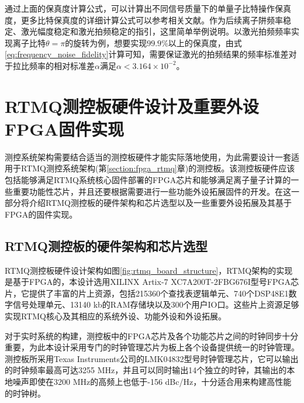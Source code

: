 通过上面的保真度计算公式，可以计算出不同信号质量下的单量子比特操作保真度，更多比特保真度的详细计算公式可以参考相关文献\cite[]{van_Dijk_Kawakami_Schouten_Veldhorst_Vandersypen_Babaie_Charbon_Sebastiano_2019}。作为后续离子阱频率稳定、激光幅度稳定和激光拍频稳定的指引，这里简单举例说明。以激光拍频频率实现离子比特$\theta=\pi$的旋转为例，想要实现$99.9\%$以上的保真度，由式\eqref{eq:frequency_noise_fidelity}计算可知，需要保证激光的拍频结果的频率标准差对于拉比频率的相对标准差$\alpha$满足$\alpha < 3.164\times10^{-2}$。






\section[RTMQ测控板硬件设计及重要外设FPGA固件实现]{RTMQ测控板硬件设计及重要外设FPGA固件实现}

测控系统架构需要结合适当的测控板硬件才能实际落地使用，为此需要设计一套适用于RTMQ测控系统架构(第\ref{section:fpga_rtmq}章)的测控板。该测控板硬件应该包括能够满足RTMQ系统核心固件部署的FPGA芯片和能够满足离子量子计算的一些重要功能性芯片，并且还要根据需要进行一些功能外设拓展固件的开发。在这一部分将介绍RTMQ测控板的硬件架构和芯片选型以及一些重要外设拓展及其基于FPGA的固件实现。

\subsection[RTMQ测控板的硬件架构和芯片选型]{RTMQ测控板的硬件架构和芯片选型}

RTMQ测控板硬件设计架构如图\ref{fig:rtmq_board_structure}，RTMQ架构的实现是基于FPGA的，本设计选用XILINX Artix-7 XC7A200T-2FBG676I\cite[]{7_Series_FPGAs_2020}型号FPGA芯片，它提供了丰富的片上资源，包括215360个查找表逻辑单元、740个DSP48E1数字信号处理单元、13140 kb的RAM存储块以及300个用户IO口。这些片上资源足够实现RTMQ核心及其相应的系统外设、功能外设和外设拓展。

对于实时系统的构建，测控板中的FPGA芯片及各个功能芯片之间的时钟同步十分重要，为此本设计采用专门的时钟管理芯片为板上各个设备提供统一的时钟管理。测控板所采用Texas Instruments公司的LMK04832\cite[]{lmk04832_2018}型号时钟管理芯片，它可以输出的时钟频率最高可达3255 MHz，并且可以同时输出14个独立的时钟，其输出的本地噪声即使在3200 MHz的高频上也低于-156 dBc/Hz，十分适合用来构建高性能的时钟树。


